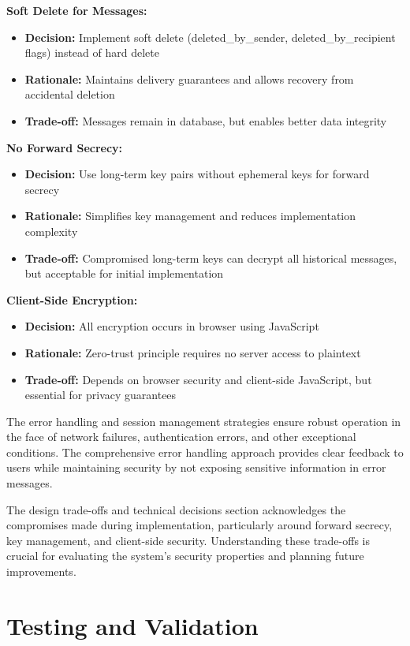\documentclass[12pt,a4paper,openany]{book}
\begin{document}
\textbf{Soft Delete for Messages:}
\begin{itemize}
\item \textbf{Decision:} Implement soft delete (deleted\_by\_sender, deleted\_by\_recipient flags) instead of hard delete
\item \textbf{Rationale:} Maintains delivery guarantees and allows recovery from accidental deletion
\item \textbf{Trade-off:} Messages remain in database, but enables better data integrity
\end{itemize}

\textbf{No Forward Secrecy:}
\begin{itemize}
\item \textbf{Decision:} Use long-term key pairs without ephemeral keys for forward secrecy
\item \textbf{Rationale:} Simplifies key management and reduces implementation complexity
\item \textbf{Trade-off:} Compromised long-term keys can decrypt all historical messages, but acceptable for initial implementation
\end{itemize}

\textbf{Client-Side Encryption:}
\begin{itemize}
\item \textbf{Decision:} All encryption occurs in browser using JavaScript
\item \textbf{Rationale:} Zero-trust principle requires no server access to plaintext
\item \textbf{Trade-off:} Depends on browser security and client-side JavaScript, but essential for privacy guarantees
\end{itemize}

The error handling and session management strategies ensure robust operation in the face of network failures, authentication errors, and other exceptional conditions. The comprehensive error handling approach provides clear feedback to users while maintaining security by not exposing sensitive information in error messages.

The design trade-offs and technical decisions section acknowledges the compromises made during implementation, particularly around forward secrecy, key management, and client-side security. Understanding these trade-offs is crucial for evaluating the system's security properties and planning future improvements.

\section{Testing and Validation}
\end{document}
